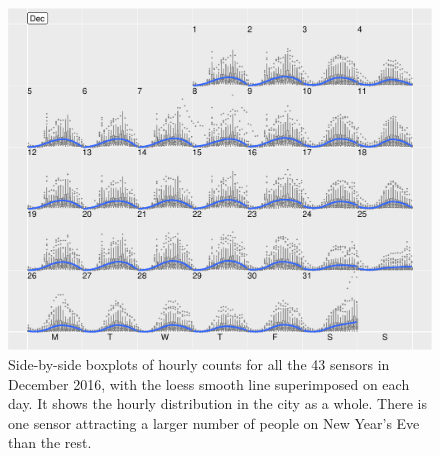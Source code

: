 \begin{Schunk}
\begin{figure}

{\centering \includegraphics[width=\textwidth]{figure/boxplot-1} 

}

\caption[Side-by-side boxplots of hourly counts for all the 43 sensors in December 2016, with the loess smooth line superimposed on each day]{Side-by-side boxplots of hourly counts for all the 43 sensors in December 2016, with the loess smooth line superimposed on each day. It shows the hourly distribution in the city as a whole. There is one sensor attracting a larger number of people on New Year's Eve than the rest.}\label{fig:boxplot}
\end{figure}
\end{Schunk}

